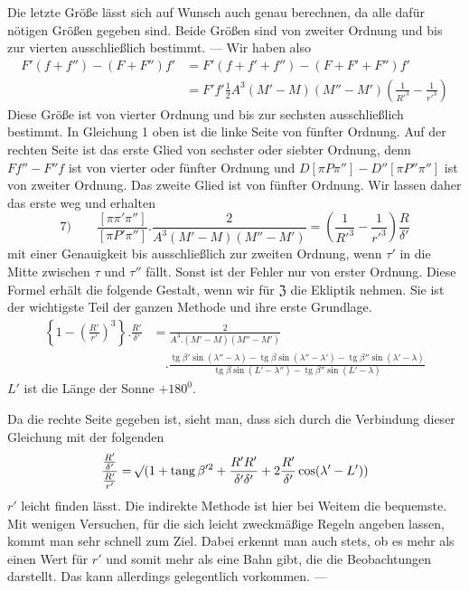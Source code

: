 Die letzte Größe lässt sich auf Wunsch auch genau berechnen, da alle dafür nötigen Größen gegeben sind. Beide Größen sind von zweiter Ordnung und bis zur vierten ausschließlich bestimmt. — Wir haben also
\[
\begin{aligned}
F'(f+f'')-(F+F'')f'&=F'(f+f'+f'')-(F+F'+F'')f'\\
&=F'f'\tfrac12A^3(M'-M)(M''-M')\left(\frac1{R'^3}-\frac1{r'^3}\right)
\end{aligned}
\]
Diese Größe ist von vierter Ordnung und bis zur sechsten ausschließlich bestimmt. In Gleichung 1 oben ist die linke Seite von fünfter Ordnung. Auf der rechten Seite ist das erste Glied von sechster oder siebter Ordnung, denn $Ff''-F''f$ ist von vierter oder fünfter Ordnung und $D[\pi P\pi'']-D''[\pi P''\pi'']$ ist von zweiter Ordnung. Das zweite Glied ist von fünfter Ordnung. Wir lassen daher das erste weg und erhalten
\[
7)\qquad\frac{[\pi\pi'\pi'']}{[\pi P'\pi'']}.\frac2{A^3(M'-M)(M''-M')}=\left(\frac1{R'^3}-\frac1{r'^3}\right)\frac R{\delta'}
\]
%
mit einer Genauigkeit bis ausschließlich zur zweiten Ordnung, wenn $\tau'$ in die Mitte zwischen $\tau$ und $\tau''$ fällt. Sonst ist der Fehler nur von erster Ordnung. Diese Formel erhält die folgende Gestalt, wenn wir für $\mathfrak{Z}$ die Ekliptik nehmen. Sie ist der wichtigste Teil der ganzen Methode und ihre erste Grundlage.
\[
\begin{aligned}
\left\{1-\left(\frac{R'}{r'}\right)^3\right\}.\frac{R'}{\delta'}&=\frac2{A^3.(M'-M)(M''-M')}\\
&\quad.\frac{\operatorname{tg}\beta'\sin(\lambda''-\lambda)-\operatorname{tg}\beta\sin(\lambda''-\lambda')-\operatorname{tg}\beta''\sin(\lambda'-\lambda)}{\operatorname{tg}\beta\sin(L'-\lambda'')-\operatorname{tg}\beta''\sin(L'-\lambda)}
\end{aligned}
\]
$L'$ ist die Länge der Sonne $+180^0$.

Da die rechte Seite gegeben ist, sieht man, dass sich durch die Verbindung dieser Gleichung mit der folgenden
\[
\frac{\frac{R'}{\delta'}}{\frac{R'}{r'}}=\mathord{{}^{}\!\surd}(1+\operatorname{tang}\beta'^2+\frac{R'R'}{\delta'\delta'}+2\frac{R'}{\delta'}\cos(\lambda'-L'))
\]
$r'$ leicht finden lässt. Die indirekte Methode ist hier bei Weitem die bequemste. Mit wenigen Versuchen, für die sich leicht zweckmäßige Regeln angeben lassen, kommt man sehr schnell zum Ziel. Dabei erkennt man auch stets, ob es mehr als einen Wert für $r'$ und somit mehr als eine Bahn gibt, die die Beobachtungen darstellt. Das kann allerdings gelegentlich vorkommen. —

